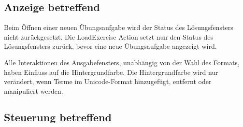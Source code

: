 \documentclass[parskip=full,11pt,openany]{scrreprt}
\begin{document}
\subsection{Anzeige betreffend}

\begin{itemize}[itemsep=3ex]
	
	{Beim Öffnen einer neuen Übungsaufgabe wird der Status des Lösungsfensters nicht zurückgesetzt.}
	{Die LoadExercise Action setzt nun den Status des Lösungsfensters zurück, bevor eine neue Übungsaufgabe angezeigt wird.}
	
	{Alle Interaktionen des Ausgabefensters, unabhängig von der Wahl des Formats, haben Einfluss auf die Hintergrundfarbe.}
	{Die Hintergrundfarbe wird nur verändert, wenn Terme im Unicode-Format hinzugefügt, entfernt oder manipuliert werden.}
\end{itemize}

\subsection{Steuerung betreffend}
\end{document}
